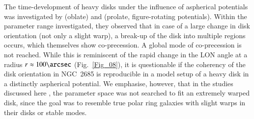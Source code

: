 \documentclass[oldversion]{aa}
\begin{document}
The time-development of heavy disks under the influence of aspherical
potentials was investigated by \citet[][]{Sparke86} (oblate) and
\citet[][]{Arnaboldi94} (prolate, figure-rotating potentials). Within
the parameter range investigated, they observed that in case of a
large change in disk orientation (not only a slight warp), a break-up
of the disk into multiple regions occurs, which themselves show
co-precession. A global mode of co-precession is not reached. While
this is reminiscent of the rapid change in the LON angle at a radius
$r\approx 100\arcsec$ (Fig.~\ref{Fig_08}), it is questionable if the
coherency of the disk orientation in NGC~2685 is reproducible in a
model setup of a heavy disk in a distinctly aspherical potential. We
emphasise, however, that in the studies discussed here
\citep[][]{Sparke86,Sparke88,Arnaboldi94}, the parameter space was not
searched to fit an extremely warped disk, since the goal was to
resemble true polar ring galaxies with slight warps in their disks or
stable modes.
\end{document}
